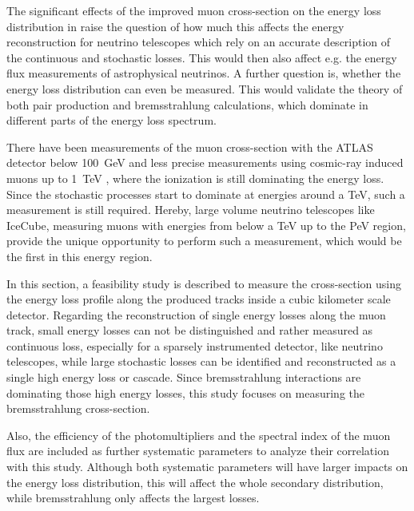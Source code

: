 The significant effects of the improved muon cross-section on the energy loss distribution in  raise the question of how much this affects the energy reconstruction for neutrino telescopes which rely on an accurate description of the continuous and stochastic losses.
This would then also affect e.g. the energy flux measurements of astrophysical neutrinos.
A further question is, whether the energy loss distribution can even be measured.
This would validate the theory of both pair production and bremsstrahlung calculations, which dominate in different parts of the energy loss spectrum.

There have been measurements of the muon cross-section with the ATLAS detector below \SI{100}{GeV} \cite{Amaral01MuonMeasure} and less precise measurements using cosmic-ray induced muons up to \SI{1}{TeV} \cite{Sakumoto92TeVMuonMeasure}, where the ionization is still dominating the energy loss.
Since the stochastic processes start to dominate at energies around a TeV, such a measurement is still required.
Hereby, large volume neutrino telescopes like IceCube, measuring muons with energies from below a TeV up to the PeV region, provide the unique opportunity to perform such a measurement, which would be the first in this energy region.

In this section, a feasibility study is described to measure the cross-section using the energy loss profile along the produced tracks inside a cubic kilometer scale detector.
Regarding the reconstruction of single energy losses along the muon track, small energy losses can not be distinguished and rather measured as continuous loss, especially for a sparsely instrumented detector, like neutrino telescopes, while large stochastic losses can be identified and reconstructed as a single high energy loss or cascade.
Since bremsstrahlung interactions are dominating those high energy losses, this study focuses on measuring the bremsstrahlung cross-section.

Also, the efficiency of the photomultipliers and the spectral index of the muon flux are included as further systematic parameters to analyze their correlation with this study.
Although both systematic parameters will have larger impacts on the energy loss distribution, this will affect the whole secondary distribution, while bremsstrahlung only affects the largest losses.


